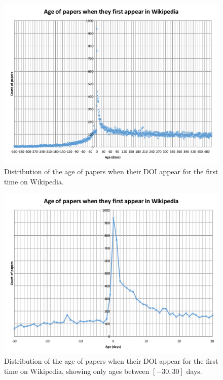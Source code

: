 \begin{figure}[h]
\centering
\includegraphics[keepaspectratio=true, width=\textwidth]{assets/age_of_papers_at_first_appearance}
\caption{Distribution of the age of papers when their DOI appear for the first time on Wikipedia.}
\label{fig:age_of_papers_at_first_appearance}
\end{figure}

\begin{figure}[h]
\centering
\includegraphics[keepaspectratio=true, width=\textwidth]{assets/age_of_papers_at_first_appearance_-30+30}
\caption{Distribution of the age of papers when their DOI appear for the first time on Wikipedia, showing only ages between $[-30, 30]$ days.}
\label{fig:age_of_papers_at_first_appearance_zoom}
\end{figure}


